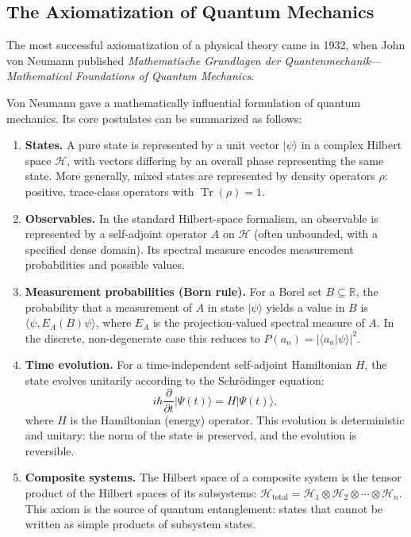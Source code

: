 \subsection{The Axiomatization of Quantum Mechanics}

The most successful axiomatization of a physical theory came in 1932, when John von Neumann published \emph{Mathematische Grundlagen der Quantenmechanik}---\emph{Mathematical Foundations of Quantum Mechanics}.

Von Neumann gave a mathematically influential formulation of quantum mechanics. Its core postulates can be summarized as follows:

\begin{enumerate}
    \item \textbf{States.} A pure state is represented by a unit vector $|\psi\rangle$ in a complex Hilbert space $\mathcal{H}$, with vectors differing by an overall phase representing the same state. More generally, mixed states are represented by density operators $\rho$: positive, trace-class operators with $\operatorname{Tr}(\rho)=1$.

    \item \textbf{Observables.} In the standard Hilbert-space formalism, an observable is represented by a self-adjoint operator $A$ on $\mathcal{H}$ (often unbounded, with a specified dense domain). Its spectral measure encodes measurement probabilities and possible values.

    \item \textbf{Measurement probabilities (Born rule).} For a Borel set $B\subseteq\mathbb{R}$, the probability that a measurement of $A$ in state $|\psi\rangle$ yields a value in $B$ is $\langle\psi,E_A(B)\psi\rangle$, where $E_A$ is the projection-valued spectral measure of $A$. In the discrete, non-degenerate case this reduces to $P(a_n)=|\langle a_n|\psi\rangle|^2$.

    \item \textbf{Time evolution.} For a time-independent self-adjoint Hamiltonian $H$, the state evolves unitarily according to the Schr\"odinger equation:
    \[
        i\hbar \frac{\partial}{\partial t}|\Psi(t)\rangle = H|\Psi(t)\rangle,
    \]
    where $H$ is the Hamiltonian (energy) operator. This evolution is deterministic and unitary: the norm of the state is preserved, and the evolution is reversible.

    \item \textbf{Composite systems.} The Hilbert space of a composite system is the tensor product of the Hilbert spaces of its subsystems: $\mathcal{H}_{\text{total}} = \mathcal{H}_1 \otimes \mathcal{H}_2 \otimes \cdots \otimes \mathcal{H}_n$. This axiom is the source of quantum entanglement: states that cannot be written as simple products of subsystem states.
\end{enumerate}

